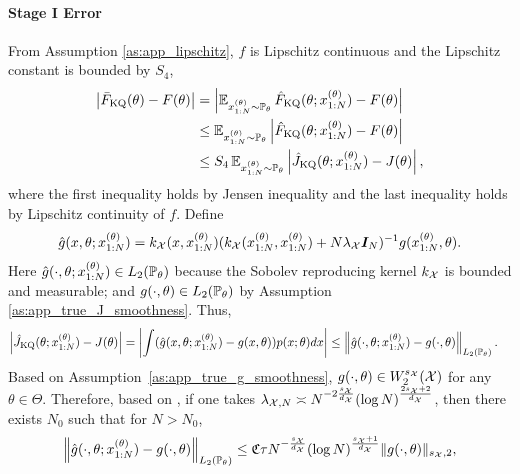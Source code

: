 \paragraph{Stage I Error}
From Assumption \ref{as:app_lipschitz}, $f$ is Lipschitz continuous and the Lipschitz constant is bounded by $S_4$,
\begin{align}\label{eq:lipschitz_F}
     \left| \bar{F}_{\text{KQ}}(\theta) - F(\theta) \right| &= \left| \operatorname{\mathbb{E}}_{x_{1:N}^{(\theta)} \sim \mathbb{P}_\theta} \hat{F}_{\text{KQ}} (\theta; x_{1:N}^{(\theta)}) - F(\theta) \right| \nonumber \\
     &\leq \operatorname{\mathbb{E}}_{x_{1:N}^{(\theta)} \sim \mathbb{P}_\theta} \left| \hat{F}_{\text{KQ}} (\theta; x_{1:N}^{(\theta)}) - F(\theta) \right| \nonumber \\
     &\leq S_4 \operatorname{\mathbb{E}}_{x_{1:N}^{(\theta)} \sim \mathbb{P}_\theta} \left| \hat{J}_{\text{KQ}}(\theta; x_{1:N}^{(\theta)}) - J(\theta) \right| ,
\end{align}
where the first inequality holds by Jensen inequality and the last inequality holds by Lipschitz continuity of $f$.
Define 
\begin{align}
\label{eq:defn_of_g}
    \hat{g}(x, \theta; x_{1:N}^{(\theta)}) = k_{\mathcal{X}}(x, x_{1:N}^{(\theta)}) (k_{\mathcal{X}}(x_{1:N}^{(\theta)}, x_{1:N}^{(\theta)}) + N \lambda_{\mathcal{X}} \boldsymbol{I}_N)^{-1} g(x_{1:N}^{(\theta)}, \theta) .
\end{align}
Here $\hat{g}(\cdot, \theta; x_{1:N}^{(\theta)}) \in L_2(\mathbb{P}_\theta)$ because the Sobolev reproducing kernel $k_{\mathcal{X}}$ is bounded and measurable; and $g(\cdot, \theta) \in L_2(\mathbb{P}_\theta)$ by Assumption \ref{as:app_true_J_smoothness}. Thus, 
\begin{align}\label{eq:F_L_g}
    \left| \hat{J}_{\text{KQ}}(\theta; x_{1:N}^{(\theta)}) - J(\theta) \right| &= \left| \int ( \hat{g}(x, \theta; x_{1:N}^{(\theta)}) - g(x, \theta) ) p(x; \theta) dx \right| \leq \left\| \hat{g}(\cdot, \theta; x_{1:N}^{(\theta)}) - g(\cdot, \theta) \right\|_{L_2(\mathbb{P}_\theta)} .
\end{align}
Based on Assumption~\ref{as:app_true_g_smoothness}, $g(\cdot, \theta) \in W_2^{s_{\mathcal{X}}}(\mathcal{X})$ for any $\theta \in \Theta$.
Therefore, based on , if one takes $\lambda_{\mathcal{X}, N} \asymp N^{-2 \frac{s_{\mathcal{X}}}{d_{\mathcal{X}}}} (\log N)^{\frac{2s_{\mathcal{X}}+2}{d_{\mathcal{X}}}}$, then there exists $N_0$ such that for $N > N_0$,
\begin{align}\label{eq:high_prob_hat_g_g}
    \left\| \hat{g}(\cdot, \theta; x_{1:N}^{(\theta)}) - g(\cdot, \theta) \right\|_{L_2( \mathbb{P}_\theta ) } \leq \mathfrak{C} \tau N^{-\frac{s_{\mathcal{X}}}{d_{\mathcal{X}}}} (\log N)^{\frac{s_{\mathcal{X}}+1}{d_{\mathcal{X}}}} \| g(\cdot, \theta)\|_{s_{\mathcal{X}},2},
\end{align}
